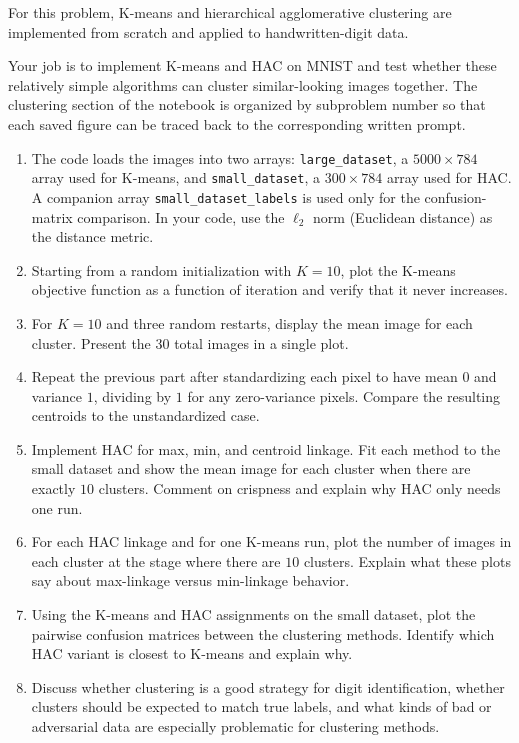 \documentclass[submit]{../harvardml}
\begin{document}
\begin{problem}
For this problem, K-means and hierarchical agglomerative clustering are implemented from scratch and applied to handwritten-digit data.

Your job is to implement K-means and HAC on MNIST and test whether these relatively simple algorithms can cluster similar-looking images together. The clustering section of the notebook is organized by subproblem number so that each saved figure can be traced back to the corresponding written prompt.

\begin{enumerate}[leftmargin=*]
    \item The code loads the images into two arrays: \texttt{large\_dataset}, a \(5000 \times 784\) array used for K-means, and \texttt{small\_dataset}, a \(300 \times 784\) array used for HAC. A companion array \texttt{small\_dataset\_labels} is used only for the confusion-matrix comparison. In your code, use the \(\ell_2\) norm (Euclidean distance) as the distance metric.
    \item Starting from a random initialization with \(K=10\), plot the K-means objective function as a function of iteration and verify that it never increases.
    \item For \(K=10\) and three random restarts, display the mean image for each cluster. Present the \(30\) total images in a single plot.
    \item Repeat the previous part after standardizing each pixel to have mean \(0\) and variance \(1\), dividing by \(1\) for any zero-variance pixels. Compare the resulting centroids to the unstandardized case.
    \item Implement HAC for max, min, and centroid linkage. Fit each method to the small dataset and show the mean image for each cluster when there are exactly \(10\) clusters. Comment on crispness and explain why HAC only needs one run.
    \item For each HAC linkage and for one K-means run, plot the number of images in each cluster at the stage where there are \(10\) clusters. Explain what these plots say about max-linkage versus min-linkage behavior.
    \item Using the K-means and HAC assignments on the small dataset, plot the pairwise confusion matrices between the clustering methods. Identify which HAC variant is closest to K-means and explain why.
    \item Discuss whether clustering is a good strategy for digit identification, whether clusters should be expected to match true labels, and what kinds of bad or adversarial data are especially problematic for clustering methods.
\end{enumerate}
\end{problem}
\end{document}
